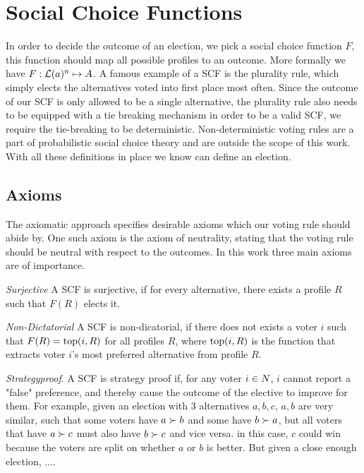 \section{Social Choice Functions}
\label{sec:SCF}
In order to decide the outcome of an election, we pick a social choice function $F$, this function should map all possible profiles to an outcome. More formally we have $F: \mathcal{L}(a)^n \mapsto A$. A famous example of a SCF is the plurality rule, which simply elects the alternatives voted into first place most often. Since the outcome of our SCF is only allowed to be a single alternative, the plurality rule also needs to be equipped with a tie breaking mechanism in order to be a valid SCF, we require the tie-breaking to be deterministic. Non-deterministic voting rules are a part of probabilistic social choice theory and are outside the scope of this work. With all these definitions in place we know can define an election.


\subsection{Axioms}
The axiomatic approach specifies desirable axioms which our voting rule should abide by. One such axiom is the axiom of neutrality, stating that the voting rule should be neutral with respect to the outcomes. In this work three main axioms are of importance.

\textit{Surjective} A SCF is surjective, if for every alternative, there exists a profile $R$ such that $F(R)$ elects it.

\textit{Non-Dictatorial} A SCF is non-dicatorial, if there does not exists a voter $i$ such that $F(R) = \textnormal{top}(i,R)$ for all profiles $R$, where $\textnormal{top}(i,R)$ is the function that extracts voter $i$'s most preferred alternative from profile $R$.

\textit{Strategyproof}. A SCF is strategy proof if, for any voter $i \in N$, $i$ cannot report a "false" preference, and thereby cause the outcome of the elective to improve for them. For example, given an election with 3 alternatives $a, b, c$, $a,b$  are very similar, such that some voters have $a \succ b$ and some have $ b \succ a $, but all voters that have $a \succ c$ must also have $b \succ c$ and vice versa. in this case, $c$ could win because the voters are split on whether $a$ or $b$ is better. But given a close enough election, .... %

